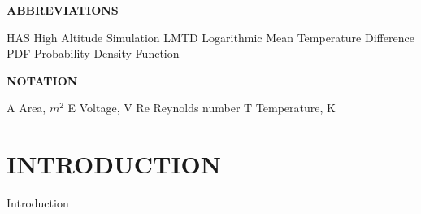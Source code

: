 \documentclass[12pt,a4paper]{report}
\begin{document}
\begin{abstract}

Overall electric energy conservation and improvement in electrical energy efficiency has been a topic of interest to the electric power industry for long time, since 40\%\ of total primary energy used is in the form of electricity.  There are many facets to the energy conservation and/or energy efficiency techniques.  Energy conservation by voltage reduction popularly called “CVR” has recently gained some momentum, in particular, to reduce the peak demand.  This is also an integral part of the discussion in the future smarter grid technology.  This paper addresses the pros and cons of the Conservation Voltage Reduction application including a thorough literature search, practical applications and a quantifiable measure of its actual amount of energy saving from utilities and the cost associated with it.  It is expected that this paper will serve as a foundation to all practicing engineers addressing the issue of CVR.  
\end{abstract}
\tableofcontents %
\listoffigures
\listoftables
\newpage
\begin{center}
  \textbf{ABBREVIATIONS} 
  \end{center}
  HAS \hspace{.5cm} High Altitude Simulation \newline
LMTD \hspace{.3cm}Logarithmic Mean Temperature Difference \newline
PDF \hspace{.5cm} Probability Density Function\newline
\vspace{2cm}
\begin{center}
  \textbf{NOTATION} 
  \end{center}
A Area, $m^2$ \newline
E Voltage, V\newline
Re Reynolds number\newline
T Temperature, K\newline
\thispagestyle{empty}



    

\chapter{ INTRODUCTION} Introduction
\end{document}

